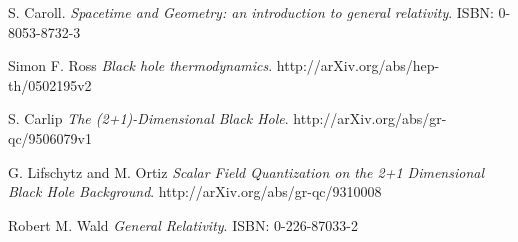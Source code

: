 \documentclass[a4paper,12pt]{article}
\theoremstyle{definition}
\theoremstyle{theorem}
\numberwithin{equation}{section}
\begin{document}
\begin{thebibliography}{9}

S. Caroll.
\textit{Spacetime and Geometry: an introduction to general relativity}. 
ISBN: 0-8053-8732-3

Simon F. Ross
\textit{Black hole thermodynamics}.
http://arXiv.org/abs/hep-th/0502195v2

S. Carlip
\textit{The (2+1)-Dimensional Black Hole}. 
http://arXiv.org/abs/gr-qc/9506079v1

G. Lifschytz and M. Ortiz
\textit{Scalar Field Quantization on the 2+1 Dimensional Black Hole Background}. 
http://arXiv.org/abs/gr-qc/9310008

Robert M. Wald
\textit{General Relativity}. 
ISBN: 0-226-87033-2


\end{thebibliography}

\clearpage


\end{document}
